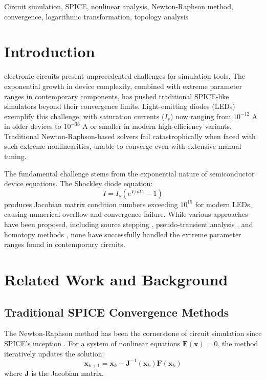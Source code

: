 \documentclass[journal]{IEEEtran}
\begin{document}
\begin{IEEEkeywords}
Circuit simulation, SPICE, nonlinear analysis, Newton-Raphson method, convergence, logarithmic transformation, topology analysis
\end{IEEEkeywords}

\section{Introduction}
 electronic circuits present unprecedented challenges for simulation tools. The exponential growth in device complexity, combined with extreme parameter ranges in contemporary components, has pushed traditional SPICE-like simulators beyond their convergence limits. Light-emitting diodes (LEDs) exemplify this challenge, with saturation currents ($I_s$) now ranging from $10^{-12}$ A in older devices to $10^{-38}$ A or smaller in modern high-efficiency variants. Traditional Newton-Raphson-based solvers fail catastrophically when faced with such extreme nonlinearities, unable to converge even with extensive manual tuning.

The fundamental challenge stems from the exponential nature of semiconductor device equations. The Shockley diode equation:
\begin{equation}
I = I_s(e^{V/nV_t} - 1)
\end{equation}
produces Jacobian matrix condition numbers exceeding $10^{15}$ for modern LEDs, causing numerical overflow and convergence failure. While various approaches have been proposed, including source stepping \cite{kundert1995}, pseudo-transient analysis \cite{dong2007}, and homotopy methods \cite{watson1989}, none have successfully handled the extreme parameter ranges found in contemporary circuits.


\section{Related Work and Background}

\subsection{Traditional SPICE Convergence Methods}
The Newton-Raphson method has been the cornerstone of circuit simulation since SPICE's inception \cite{nagel1973}. For a system of nonlinear equations $\mathbf{F}(\mathbf{x}) = 0$, the method iteratively updates the solution:
\begin{equation}
\mathbf{x}_{k+1} = \mathbf{x}_k - \mathbf{J}^{-1}(\mathbf{x}_k)\mathbf{F}(\mathbf{x}_k)
\end{equation}
where $\mathbf{J}$ is the Jacobian matrix.
\end{document}
